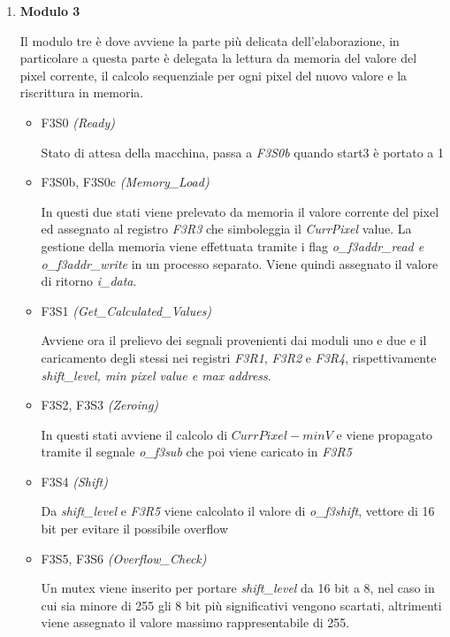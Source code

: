 \documentclass{article}
\begin{document}
\begin{enumerate}
    \item\textbf{Modulo 3} 
		
		Il modulo tre è dove avviene la parte più delicata dell'elaborazione, in particolare a questa parte è delegata la lettura da memoria del valore del pixel corrente, il calcolo sequenziale per ogni pixel del nuovo valore e la riscrittura in memoria.
		
		\begin{itemize}
		
		\item F3S0 \emph{(Ready)}
		
		Stato di attesa della macchina, passa a \emph{F3S0b} quando start3 è portato a 1
		
		\item F3S0b, F3S0c \emph{(Memory\_Load)}
		
		In questi due stati viene prelevato da memoria il valore corrente del pixel ed assegnato al registro \emph{F3R3} che simboleggia il \emph{CurrPixel} value. La gestione della memoria viene effettuata tramite i flag \emph{o\_f3addr\_read \emph{e} o\_f3addr\_write} in un processo separato. Viene quindi assegnato il valore di ritorno \emph{i\_data}.
		
		\item F3S1 \emph{(Get\_Calculated\_Values)}
		
		Avviene ora il prelievo dei segnali provenienti dai moduli uno e due e il caricamento degli stessi nei registri \emph{F3R1}, \emph{F3R2} e \emph{F3R4}, rispettivamente \textit{shift\_level, min pixel value \emph{e} max address}.
		
		\item F3S2, F3S3 \emph{(Zeroing)}
		
		In questi stati avviene il calcolo di \(CurrPixel - minV\) e viene propagato tramite il segnale \emph{o\_f3sub} che poi viene caricato in \emph{F3R5}
		
		\item F3S4 \emph{(Shift)}
		
		Da \emph{shift\_level} e \emph{F3R5} viene calcolato il valore di \emph{o\_f3shift}, vettore di 16 bit per evitare il possibile overflow
		
		\item F3S5, F3S6 \emph{(Overflow\_Check)}
		
		Un mutex viene inserito per portare \emph{shift\_level} da 16 bit a 8, nel caso in cui sia minore di 255 gli 8 bit più significativi vengono scartati, altrimenti viene assegnato il valore massimo rappresentabile di 255.
		

\end{itemize}
\end{enumerate}
\end{document}
